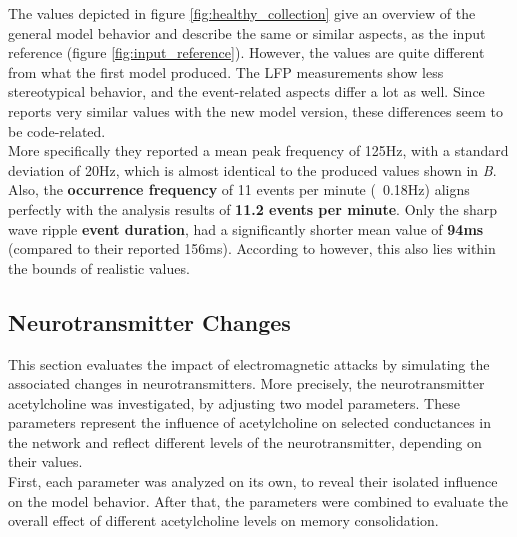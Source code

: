     The values depicted in figure \ref{fig:healthy_collection} give an overview of the general model behavior and describe the same or similar aspects, as the input reference (figure \ref{fig:input_reference}). However, the values are quite different from what the first model produced. The LFP measurements show less stereotypical behavior, and the event-related aspects differ a lot as well. Since \textcite{AmelieAussel.2020} reports very similar values with the new model version, these differences seem to be code-related.\\
    More specifically they reported a mean peak frequency of 125Hz, with a standard deviation of 20Hz, which is almost identical to the produced values shown in \textit{B}. Also, the \textbf{occurrence frequency} of 11 events per minute (~0.18Hz) aligns perfectly with the analysis results of \textbf{11.2 events per minute}. Only the sharp wave ripple \textbf{event duration}, had a significantly shorter mean value of \textbf{94ms} (compared to their reported 156ms). According to \textcite{Buzsaki.2015} however, this also lies within the bounds of realistic values.\\


    \subsection{Neurotransmitter Changes}
    This section evaluates the impact of electromagnetic attacks by simulating the associated changes in neurotransmitters. More precisely, the neurotransmitter acetylcholine was investigated, by adjusting two model parameters. These parameters represent the influence of acetylcholine on selected conductances in the network and reflect different levels of the neurotransmitter, depending on their values.\\
    First, each parameter was analyzed on its own, to reveal their isolated influence on the model behavior. After that, the parameters were combined to evaluate the overall effect of different acetylcholine levels on memory consolidation. 

